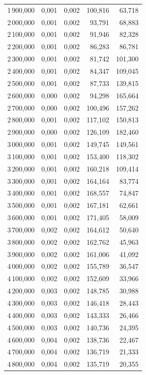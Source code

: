 \begin{longtable}{rrrrr}
1\,900,000 & 0,001 & 0,002 & 100,816 & 63,718\\
2\,000,000 & 0,001 & 0,002 & 93,791 & 68,883\\
2\,100,000 & 0,001 & 0,002 & 91,946 & 82,328\\
2\,200,000 & 0,001 & 0,002 & 86,283 & 86,781\\
2\,300,000 & 0,001 & 0,002 & 81,742 & 101,300\\
2\,400,000 & 0,001 & 0,002 & 84,347 & 109,045\\
2\,500,000 & 0,001 & 0,002 & 87,733 & 139,815\\
2\,600,000 & 0,000 & 0,002 & 94,298 & 165,664\\
2\,700,000 & 0,000 & 0,002 & 100,496 & 157,262\\
2\,800,000 & 0,001 & 0,002 & 117,102 & 150,813\\
2\,900,000 & 0,000 & 0,002 & 126,109 & 182,460\\
3\,000,000 & 0,001 & 0,002 & 149,745 & 149,561\\
3\,100,000 & 0,001 & 0,002 & 153,400 & 118,302\\
3\,200,000 & 0,001 & 0,002 & 160,218 & 109,414\\
3\,300,000 & 0,001 & 0,002 & 164,164 & 83,774\\
3\,400,000 & 0,001 & 0,002 & 168,557 & 74,847\\
3\,500,000 & 0,001 & 0,002 & 167,181 & 62,661\\
3\,600,000 & 0,001 & 0,002 & 171,405 & 58,009\\
3\,700,000 & 0,002 & 0,002 & 164,612 & 50,640\\
3\,800,000 & 0,002 & 0,002 & 162,762 & 45,963\\
3\,900,000 & 0,002 & 0,002 & 161,006 & 41,092\\
4\,000,000 & 0,002 & 0,002 & 155,789 & 36,547\\
4\,100,000 & 0,002 & 0,002 & 152,609 & 33,966\\
4\,200,000 & 0,003 & 0,002 & 148,785 & 30,988\\
4\,300,000 & 0,003 & 0,002 & 146,418 & 28,443\\
4\,400,000 & 0,003 & 0,002 & 143,333 & 26,466\\
4\,500,000 & 0,003 & 0,002 & 140,736 & 24,395\\
4\,600,000 & 0,004 & 0,002 & 138,736 & 22,467\\
4\,700,000 & 0,004 & 0,002 & 136,719 & 21,333\\
4\,800,000 & 0,004 & 0,002 & 135,719 & 20,355\\

\end{longtable}
